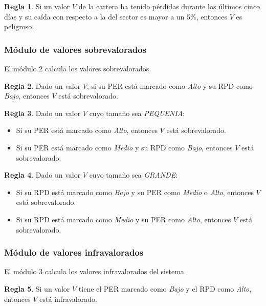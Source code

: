 \documentclass[a4paper, 11pt, titlepage]{article}
\theoremstyle{definition}
\newtheorem{regla}{Regla}
\begin{document}
    \begin{regla}
        Si un valor $V$ de la cartera ha tenido pérdidas durante los últimos cinco días y su caída con respecto a la del sector es mayor a un 5\%, entonces $V$ es peligroso.
    \end{regla}
  \subsubsection{Módulo de valores sobrevalorados}

  El módulo 2 calcula los valores sobrevalorados.
  \begin{regla}
        Dado un valor $V$, si su PER está marcado como \emph{Alto} y su RPD como \emph{Bajo}, entonces $V$ está sobrevalorado.
    \end{regla}

    \begin{regla}
        Dado un valor $V$ cuyo tamaño sea \emph{PEQUENIA}:
        \begin{itemize}
            \item Si su PER está marcado como \emph{Alto}, entonces $V$ está sobrevalorado.
            \item Si su PER está marcado como \emph{Medio} y su RPD como \emph{Bajo}, entonces $V$ está sobrevalorado.
        \end{itemize}
    \end{regla}

    \begin{regla}
        Dado un valor $V$ cuyo tamaño sea \emph{GRANDE}:
        \begin{itemize}
            \item Si su RPD está marcado como \emph{Bajo} y su PER como \emph{Medio} o \emph{Alto}, entonces $V$ está sobrevalorado.
            \item Si su RPD está marcado como \emph{Medio} y su PER como \emph{Alto}, entonces $V$ está sobrevalorado.
        \end{itemize}
    \end{regla}


  \subsubsection{Módulo de valores infravalorados}

  El módulo 3 calcula los valores infravalorados del sistema.

  \begin{regla}
      Si un valor $V$ tiene el PER marcado como \emph{Bajo} y el RPD como \emph{Alto}, entonces $V$ está infravalorado.
  \end{regla}
\end{document}
